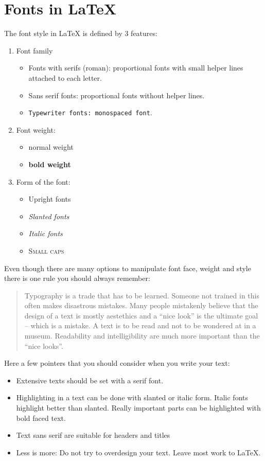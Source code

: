 \documentclass[11pt, a4paper]{article}
\newcommand{\ltx}{\LaTeX}
\begin{document}
\section{Fonts in \ltx}

The font style in \ltx{} is defined by 3 features:

\begin{enumerate}
\item Font family
\begin{itemize}
\item Fonts with serifs (roman): proportional fonts with small helper lines attached to each letter.
\item \textsf{Sans serif fonts: proportional fonts without helper lines}.
\item \texttt{Typewriter fonts: monospaced font}.
\end{itemize}
\item Font weight:
\begin{itemize}
\item normal weight
\item \textbf{bold weight}
\end{itemize}
\item Form of the font:
\begin{itemize}
\item Upright fonts
\item \textsl{Slanted fonts}
\item \textit{Italic fonts}
\item \textsc{Small caps}
\end{itemize}
\end{enumerate}

Even though there are many options to manipulate font face, weight and style there is one rule you should always remember:
\begin{quote}
Typography is a trade that has to be learned. Someone not trained in this often makes disastrous mistakes. Many people mistakenly believe that the design of a text is mostly aestethics and a ``nice look'' is the ultimate goal -- which is a mistake. A text is to be read and not to be wondered at in a museum. Readability and intelligibility are much more important than the ``nice looks''.
\end{quote}

\noindent Here a few pointers that you should consider when you write your text:
\begin{itemize}
\item[\ding{43}] Extensive texts should be set with a serif font.
\item[\ding{43}] Highlighting in a text can be done with slanted or italic form. Italic fonts highlight better than slanted. Really important parts can be highlighted with bold faced text.
\item[\ding{43}]  \textsf{Text sans serif are suitable for headers and titles}
\item[\ding{43}] Less is more: Do not try to overdesign your text. Leave most work to \ltx.
\end{itemize}
\end{document}

